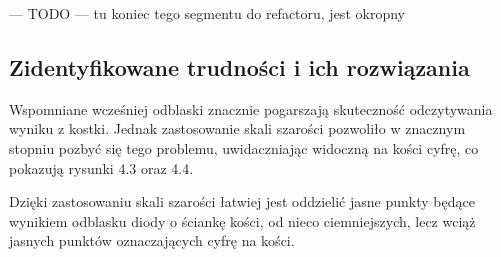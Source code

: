 --- TODO --- tu koniec tego segmentu do refactoru, jest okropny

\subsection{Zidentyfikowane trudności i ich rozwiązania}

Wspomniane wcześniej odblaski znacznie pogarszają skuteczność odczytywania wyniku z kostki.
Jednak zastosowanie skali szarości pozwoliło w znacznym stopniu pozbyć się tego problemu,
uwidaczniając widoczną na kości cyfrę, co pokazują rysunki 4.3 oraz 4.4.

Dzięki zastosowaniu skali szarości łatwiej jest oddzielić jasne punkty będące wynikiem odblasku diody o ściankę kości,
od nieco ciemniejszych, lecz wciąż jasnych punktów oznaczających cyfrę na kości.

